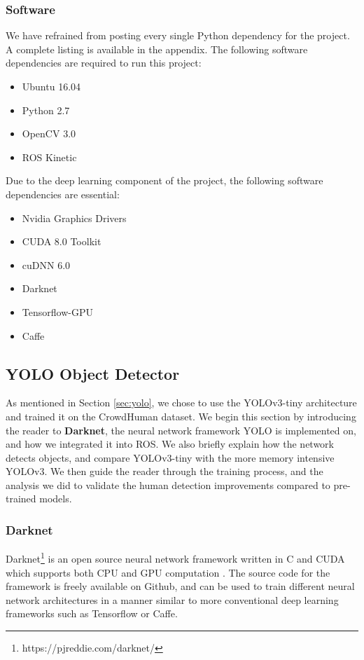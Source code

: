 \subsubsection{Software}
We have refrained from posting every single Python dependency for the project. A complete listing is available in the appendix. The following software dependencies are required to run this project:
\begin{itemize}
	\item Ubuntu 16.04
	\item Python 2.7
	\item OpenCV 3.0
	\item ROS Kinetic
\end{itemize}

Due to the deep learning component of the project, the following software dependencies are essential:
\begin{itemize}
	\item Nvidia Graphics Drivers 
	\item CUDA 8.0 Toolkit
	\item cuDNN 6.0
	\item Darknet
	\item Tensorflow-GPU
	\item Caffe
\end{itemize}

\subsection{YOLO Object Detector}
As mentioned in Section \ref{sec:yolo}, we chose to use the YOLOv3-tiny architecture and trained it on the CrowdHuman dataset. We begin this section by introducing the reader to \textbf{Darknet}, the neural network framework YOLO is implemented on, and how we integrated it into ROS. We also briefly explain how the network detects objects, and compare YOLOv3-tiny with the more memory intensive YOLOv3. We then guide the reader through the training process, and the analysis we did to validate the human detection improvements compared to pre-trained models.

\subsubsection{Darknet}
Darknet\footnote{https://pjreddie.com/darknet/} is an open source neural network framework written in C and CUDA which supports both CPU and GPU computation \cite{darknet13}. The source code for the framework is freely available on Github, and can be used to train different neural network architectures in a manner similar to more conventional deep learning frameworks such as Tensorflow or Caffe.

